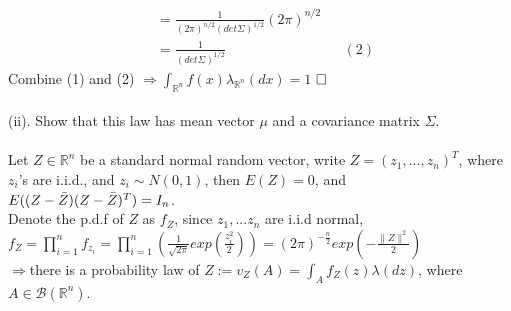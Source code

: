 \begin{answer}
\begin{equation*}
\begin{aligned}
        \\&= \frac{1}{(2 \pi )^{n/2}(det \Sigma)^{1/2}}(2 \pi )^{n/2}
        \\&= \frac{1}{(det \Sigma)^{1/2}}&&(2)
    \end{aligned}
\end{equation*}
Combine (1) and (2) $\Longrightarrow \int_{\mathbb{R}^n} f(x)\lambda_{\mathbb{R}^n}(dx)= 1$
$\hfill\Box$\\
\\
(ii). Show that this law has mean vector $\mu$ and a covariance matrix $\Sigma$.\\
\\
Let $Z \in \mathbb{R}^n$ be a standard normal random vector, write $Z = (z_1,...,z_n)^T$, where $z_i$'s are i.i.d., and $z_i \sim N(0,1)$, then $E(Z) = 0$, and $E((Z- \Bar{Z})(Z- \Bar{Z})^T) = I_n$.\\
 Denote the p.d.f of $Z$ as $f_Z$, since $z_1,...z_n$ are i.i.d normal,
 \\$f_Z = \prod_{i=1}^{n}f_{z_i}= \prod_{i=1}^{n}(\frac{1}{\sqrt{2 \pi}}exp(\frac{z_{i}^2}{2})) = (2 \pi)^{-\frac{n}{2}}exp(-\frac{ \| Z \|^2}{2})$\\
 $\Longrightarrow$there is a probability law of $Z := v_Z(A) = \int_{A} f_Z(z)\lambda(dz)$, where $A \in \mathcal{B}(\mathbb{R}^n)$.
 

\end{answer}
